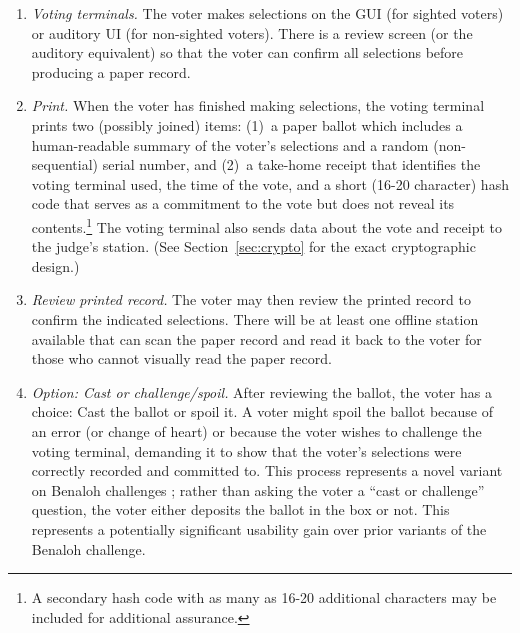 \begin{enumerate}
\item {\em Voting terminals.}
 The voter makes selections on the GUI (for sighted voters)
 or auditory UI (for non-sighted voters).
 There is a review screen (or the auditory equivalent)
 so that the voter can confirm all selections before producing a paper record.

\item {\em Print.} When the voter has finished making selections,
  the voting terminal prints two (possibly joined) items:
  (1)~a paper ballot which includes a human-readable summary of the voter's selections
  and a random (non-sequential) serial number, and
  (2)~a take-home receipt that identifies the voting terminal used, the
  time of the vote, and a short (16-20 character) hash code that
  serves as a commitment to the vote but does not reveal its contents.\footnote{A secondary hash code with as many as 16-20 additional characters may be included for additional assurance.}
  The voting terminal also sends data about the vote and receipt
  to the judge's station. (See Section~\ref{sec:crypto} for the exact
  cryptographic design.)


 
% 

\item {\em Review printed record.}
The voter may then review the printed record to confirm the indicated
selections. 
There will be at least one offline station available that can 
scan the paper record and read it back to the 
voter for those who cannot visually read the paper record.

\item {\em Option: Cast or challenge/spoil.}
After reviewing the ballot, the voter has a choice: Cast the ballot or spoil it.
 A voter might spoil the ballot because of an error (or change of heart)
 or because the voter wishes to challenge the voting terminal, demanding it to show
 that the voter's selections were correctly recorded and committed
 to. This process represents a novel variant on Benaloh challenges 
\cite{benaloh06simple,benaloh07evt}; rather than asking the voter a
``cast or challenge'' question, the voter either deposits the ballot
in the box or not. This represents a potentially significant usability
gain over prior variants of the Benaloh challenge.


\end{enumerate}
